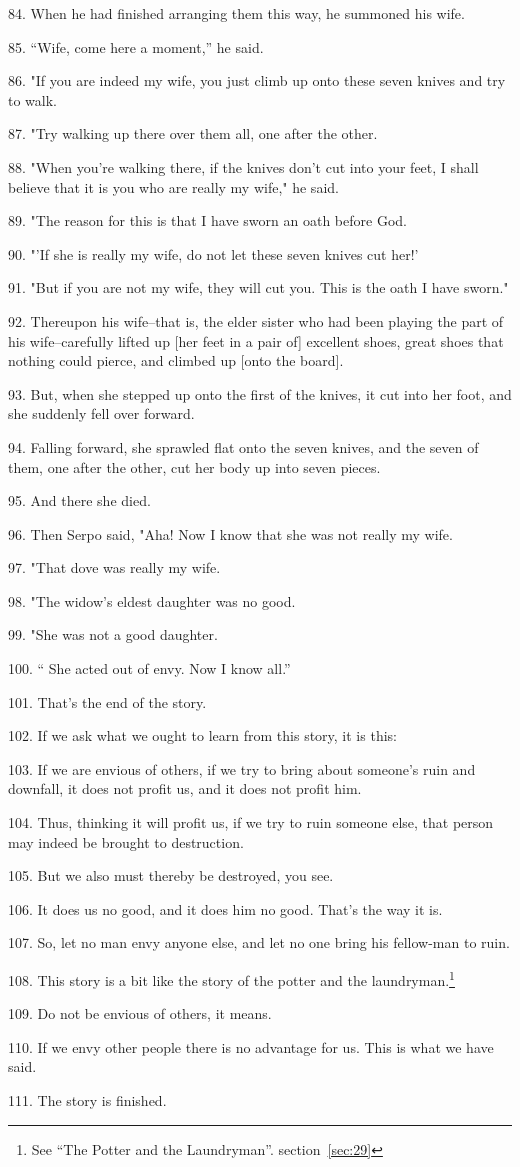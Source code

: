 84. When he had finished arranging them this way, he summoned his wife.

85. ``Wife, come here a moment,'' he said.

86. "If you are indeed my wife, you just climb up onto these seven knives
and try to walk.

87. "Try walking up there over them all, one after the other.

88. "When you're walking there, if the knives don't cut into your feet,
I shall believe that it is you who are really my wife," he said.

89. "The reason for this is that I have sworn an oath before God.

90. "'If she is really my wife, do not let these seven knives cut her!'

91. "But if you are not my wife, they will cut you. This is the oath
I have sworn."

92. Thereupon his wife--that is, the elder sister who had been playing the part
of his wife--carefully lifted up [her feet in a pair of] excellent shoes, great
shoes that nothing could pierce, and climbed up [onto the board].

93. But, when she stepped up onto the first of the knives, it cut into her foot,
and she suddenly fell over forward.

94. Falling forward, she sprawled flat onto the seven knives, and the seven of
them, one after the other, cut her body up into seven pieces.

95. And there she died.

96. Then Serpo said, "Aha! Now I know that she was not really my wife.

97. "That dove was really my wife.

98. "The widow's eldest daughter was no good.

99. "She was not a good daughter.

100. `` She acted out of envy. Now I know all.''

101. That's the end of the story.

102. If we ask what we ought to learn from this story, it is this:

103. If we are envious of others, if we try to bring about someone's ruin and downfall,
it does not profit us, and it does not profit him.

104. Thus, thinking it will profit us, if we try to ruin someone else, that person
may indeed be brought to destruction.

105. But we also must thereby be destroyed, you see.

106. It does us no good, and it does him no good. That's the way it is.

107. So, let no man envy anyone else, and let no one bring his fellow-man to ruin.

108. This story is a bit like the story of the potter and the laundryman.\footnote{See ``The Potter and the Laundryman''. section~\ref{sec:29}}

109. Do not be envious of others, it means.

110. If we envy other people there is no advantage for us. This is what we have
said.

111. The story is finished.

